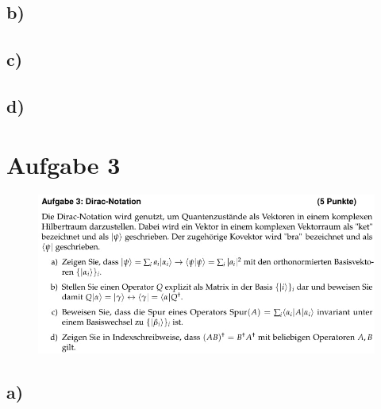 \subsection{b)}

\subsection{c)}

\subsection{d)}


\section{Aufgabe 3}

    \begin{figure}[H]
        \centering
        \includegraphics[width=\textwidth]{images/Aufgabe3.jpg}
        \label{fig:5}
    \end{figure}

\subsection{a)}

